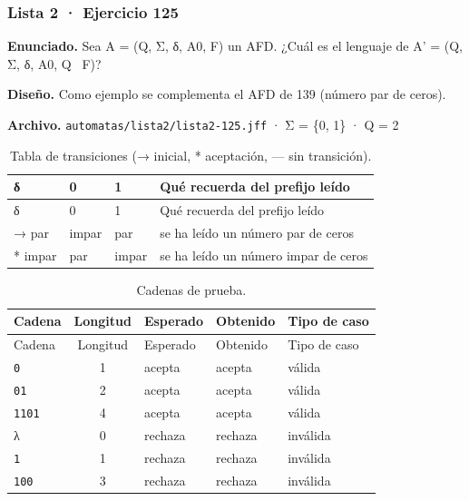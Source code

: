 
\hypertarget{lista-2-ejercicio-125}{%
\subsubsection{Lista 2 · Ejercicio 125}\label{lista-2-ejercicio-125}}

\textbf{Enunciado.} Sea A = (Q, Σ, δ, A0, F) un AFD. ¿Cuál es el lenguaje de A' = (Q, Σ, δ, A0, Q ~F)?

\textbf{Diseño.} Como ejemplo se complementa el AFD de 139 (número par de ceros).

\textbf{Archivo.} \texttt{automatas/lista2/lista2-125.jff} · Σ = \{0, 1\} · \textbar Q\textbar{} = 2

\begin{longtable}[]{@{}llll@{}}
\caption{Tabla de transiciones (→ inicial, * aceptación, --- sin transición).}\tabularnewline
\toprule\noalign{}
δ & 0 & 1 & Qué recuerda del prefijo leído \\
\midrule\noalign{}
\endfirsthead
\toprule\noalign{}
δ & 0 & 1 & Qué recuerda del prefijo leído \\
\midrule\noalign{}
\endhead
\bottomrule\noalign{}
\endlastfoot
→ par & impar & par & se ha leído un número par de ceros \\
* impar & par & impar & se ha leído un número impar de ceros \\
\end{longtable}

\begin{longtable}[]{@{}lclll@{}}
\caption{Cadenas de prueba.}\tabularnewline
\toprule\noalign{}
Cadena & Longitud & Esperado & Obtenido & Tipo de caso \\
\midrule\noalign{}
\endfirsthead
\toprule\noalign{}
Cadena & Longitud & Esperado & Obtenido & Tipo de caso \\
\midrule\noalign{}
\endhead
\bottomrule\noalign{}
\endlastfoot
\texttt{0} & 1 & acepta & acepta & válida \\
\texttt{01} & 2 & acepta & acepta & válida \\
\texttt{1101} & 4 & acepta & acepta & válida \\
λ & 0 & rechaza & rechaza & inválida \\
\texttt{1} & 1 & rechaza & rechaza & inválida \\
\texttt{100} & 3 & rechaza & rechaza & inválida \\
\end{longtable}

